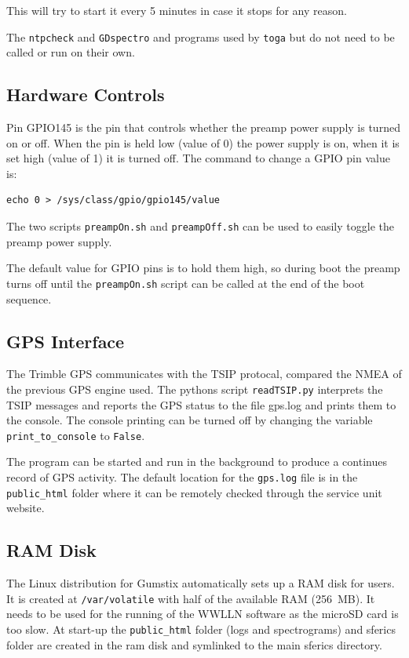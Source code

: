 This will try to start it every 5 minutes in case it stops for any reason.

The \texttt{ntpcheck} and \texttt{GDspectro} and programs used by \texttt{toga} but do not need to be called or run on their own.

\subsection{Hardware Controls}

Pin GPIO145 is the pin that controls whether the preamp power supply is turned on or off.
When the pin is held low (value of 0) the power supply is on, when it is set high (value of 1) it is turned off.
The command to change a GPIO pin value is:

\begin{verbatim}
echo 0 > /sys/class/gpio/gpio145/value
\end{verbatim}

The two scripts \texttt{preampOn.sh} and \texttt{preampOff.sh} can be used to easily toggle the preamp power supply.

The default value for GPIO pins is to hold them high, so during boot the preamp turns off until the \texttt{preampOn.sh} script can be called at the end of the boot sequence.

\subsection{GPS Interface}

The Trimble GPS communicates with the TSIP protocal, compared the NMEA of the previous GPS engine used.
The pythons script \texttt{readTSIP.py} interprets the TSIP messages and reports the GPS status to the file gps.log and prints them to the console.
The console printing can be turned off by changing the variable \texttt{print\_to\_console} to \texttt{False}.

The program can be started and run in the background to produce a continues record of GPS activity.
The default location for the \texttt{gps.log} file is in the \texttt{public\_html} folder where it can be remotely checked through the service unit website.

\subsection{RAM Disk}

The Linux distribution for Gumstix automatically sets up a RAM disk for users.
It is created at \texttt{/var/volatile} with half of the available RAM (256~MB).
It needs to be used for the running of the WWLLN software as the microSD card is too slow.
At start-up the \texttt{public\_html} folder (logs and spectrograms) and sferics folder are created in the ram disk and symlinked to the main sferics directory.

